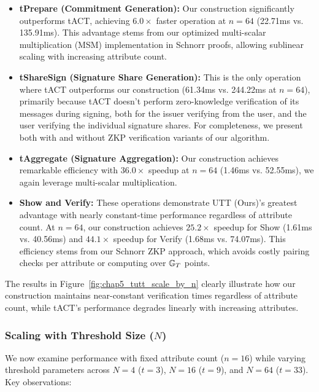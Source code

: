 \begin{itemize}
    \item \textbf{tPrepare (Commitment Generation):} Our construction significantly outperforms tACT, achieving $6.0\times$ faster operation at $n=64$ (22.71ms vs. 135.91ms). This advantage stems from our optimized multi-scalar multiplication (MSM) implementation in Schnorr proofs, allowing sublinear scaling with increasing attribute count.

    \item \textbf{tShareSign (Signature Share Generation):} This is the only operation where tACT outperforms our construction (61.34ms vs. 244.22ms at $n=64$), primarily because tACT doesn't perform zero-knowledge verification of its messages during signing, both for the issuer verifying from the user, and the user verifying the individual signature shares. For completeness, we present both with and without ZKP verification variants of our algorithm.

    \item \textbf{tAggregate (Signature Aggregation):} Our construction achieves remarkable efficiency with $36.0\times$ speedup at $n=64$ (1.46ms vs. 52.55ms), we again leverage multi-scalar multiplication. 

    \item \textbf{Show and Verify:} These operations demonstrate UTT (Ours)'s greatest advantage with nearly constant-time performance regardless of attribute count. At $n=64$, our construction achieves $25.2\times$ speedup for Show (1.61ms vs. 40.56ms) and $44.1\times$ speedup for Verify (1.68ms vs. 74.07ms). This efficiency stems from our Schnorr ZKP approach, which avoids costly pairing checks per attribute or computing over $\mathbb{G}_T$ points.
\end{itemize}

The results in Figure~\ref{fig:chap5_tutt_scale_by_n} clearly illustrate how our construction maintains near-constant verification times regardless of attribute count, while tACT's performance degrades linearly with increasing attributes.


\subsubsection{Scaling with Threshold Size ($N$)}
We now examine performance with fixed attribute count ($n=16$) while varying threshold parameters across $N=4$ ($t=3$), $N=16$ ($t=9$), and $N=64$ ($t=33$). Key observations:



